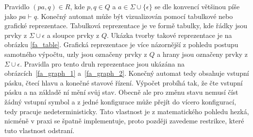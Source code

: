 Pravidlo $(pa,q) \in R$, kde $p,q \in Q$ a $a \in \Sigma \cup \{ \epsilon \} $ se dle konvencí většinou píše jako $pa \vdash q$. Konečný automat může být vizualizován pomocí tabulkové  nebo grafické reprezentace. Tabulková reprezentace je ve formě tabulky, kde řádky jsou prvky z $\Sigma \cup \epsilon $ a sloupce prvky z $Q$. Ukázka tvorby takové reprezentace je na obrázku \ref{fa_table}. Grafická reprezentace je více názornější z pohledu postupu samotného výpočtu, uzly jsou označeny prvky z $Q$ a hrany jsou označeny prvky z $\Sigma \cup \epsilon $. Pravidla pro tento druh reprezentace jsou ukázána na obrázcích~\ref{fa_graph_1} a~\ref{fa_graph_2}. Konečný automat tedy obsahuje vstupní pásku, čtecí hlavu a konečné stavové řízení. Výpočet probíhá tak, že čte vstupní pásku a na základě ní mění svůj stav. Obecně ale pro změnu stavu nemusí číst žádný vstupní symbol a z jedné konfigurace může přejít do vícero konfigurací, tedy pracuje nedeterministicky. Tato vlastnost je z matematického pohledu hezká, nicméně v praxi se špatně implementuje, proto později zavedeme restrikce, které tuto vlastnost odstraní.


